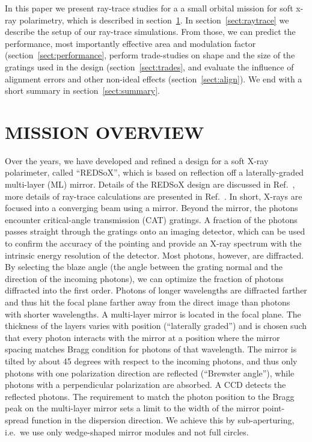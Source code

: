 \documentclass[]{spie}  %
\begin{document}
In this paper we present ray-trace studies for a a small orbital mission for soft x-ray polarimetry, which is described in section~\ref{sect:mission}. In section~\ref{sect:raytrace} we describe the setup of our ray-trace simulations. From those, we can predict the performance, most importantly effective area and modulation factor (section~\ref{sect:performance}, perform trade-studies on shape and the size of the gratings used in the design (section~\ref{sect:trades}, and evaluate the influence of alignment errors and other non-ideal effects (section~\ref{sect:align}). We end with a short summary in section~\ref{sect:summary}.

\section{MISSION OVERVIEW}
\label{sect:mission}
Over the years, we have developed and refined a design for a soft
X-ray polarimeter, called ``REDSoX'', which is based on reflection off
a laterally-graded multi-layer (ML) mirror.  Details of the REDSoX
design are discussed in Ref.~, more details of
ray-trace calculations are presented in Ref.~.
In short, X-rays are focused into a converging beam using a
mirror. Beyond the mirror, the photons encounter critical-angle
transmission (CAT)
gratings\cite{Heilmann:11,doi:10.1117/12.2188525,10.1117/12.2314180,10.1117/12.2529354}. A
fraction of the photons passes straight through the gratings onto an
imaging detector, which can be used to confirm the accuracy of the
pointing and provide an X-ray spectrum with the intrinsic energy
resolution of the detector. Most photons, however, are diffracted. By
selecting the blaze angle (the angle between the grating normal and
the direction of the incoming photons), we can optimize the fraction
of photons diffracted into the first order. Photons of longer
wavelengths are diffracted farther and thus hit the focal plane farther
away from the direct image than photons with shorter wavelengths.
A multi-layer mirror is located in
the focal plane. The thickness of the
layers varies with position (``laterally graded'') and is chosen such
that every photon interacts with the mirror at a position where the
mirror spacing matches Bragg condition for photons of that
wavelength\cite{redsox,redsoxtrace}. The mirror is tilted by about 45
degrees with respect to the incoming photons, and thus only photons
with one polarization direction are reflected (``Brewster angle''),
while photons with a perpendicular polarization are absorbed. A CCD
detects the reflected photons. The requirement to match the photon
position to the Bragg peak on the multi-layer mirror sets a limit to
the width of the mirror point-spread function in the dispersion
direction. We achieve this by sub-aperturing, i.e.\ we use only
wedge-shaped mirror modules and not full circles.
\end{document}
